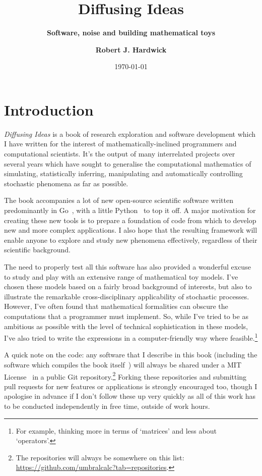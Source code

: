 \documentclass{book}
\title{\Huge \bfseries\sffamily Diffusing Ideas}
\subtitle{\Large \bfseries\sffamily \color{gray75} Software, noise and building mathematical toys}
\author{\bfseries\sffamily Robert J. Hardwick}
\date{\today}
\begin{document}
\maketitle
\frontmatter

\chapter*{Introduction}

\emph{Diffusing Ideas} is a book of research exploration and software development which I have written for the interest of mathematically-inclined programmers and computational scientists. It's the output of many interrelated projects over several years which have sought to generalise the computational mathematics of simulating, statistically inferring, manipulating and automatically controlling stochastic phenomena as far as possible.

The book accompanies a lot of new open-source scientific software written predominantly in Go~\cite{golang}, with a little Python~\cite{pythonlang} to top it off. A major motivation for creating these new tools is to prepare a foundation of code from which to develop new and more complex applications. I also hope that the resulting framework will enable anyone to explore and study new phenomena effectively, regardless of their scientific background.

The need to properly test all this software has also provided a wonderful excuse to study and play with an extensive range of mathematical toy models. I've chosen these models based on a fairly broad background of interests, but also to illustrate the remarkable cross-disciplinary applicability of stochastic processes. However, I've often found that mathematical formalities can obscure the computations that a programmer must implement. So, while I've tried to be as ambitious as possible with the level of technical sophistication in these models, I've also tried to write the expressions in a computer-friendly way where feasible.\footnote{For example, thinking more in terms of `matrices' and less about `operators'.}

A quick note on the code: any software that I describe in this book (including the software which compiles the book itself~\cite{diffusingideasbookgithub}) will always be shared under a MIT License~\cite{mitlicense} in a public Git repository.\footnote{The repositories will always be somewhere on this list: \href{https://github.com/umbralcalc?tab=repositories}{https://github.com/umbralcalc?tab=repositories}.} Forking these repositories and submitting pull requests for new features or applications is strongly encouraged too, though I apologise in advance if I don't follow these up very quickly as all of this work has to be conducted independently in free time, outside of work hours.
\end{document}
